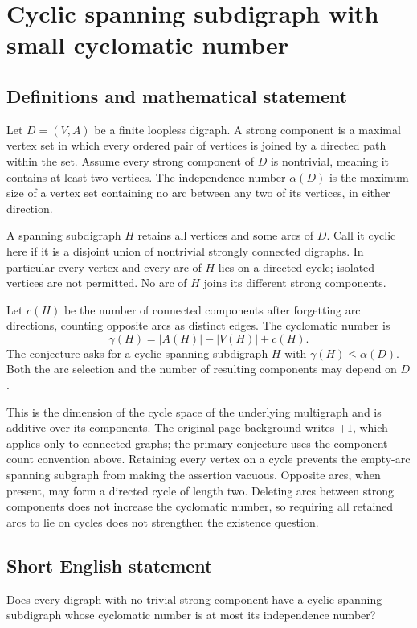 \documentclass[11pt,a4paper]{article}
\begin{document}
\section*{Cyclic spanning subdigraph with small cyclomatic number}\label{statement}

\subsection{Definitions and mathematical statement}
Let $D=(V,A)$ be a finite loopless digraph. A strong component is a maximal vertex set in which every ordered pair of vertices is joined by a directed path within the set. Assume every strong component of $D$ is nontrivial, meaning it contains at least two vertices. The independence number $\alpha(D)$ is the maximum size of a vertex set containing no arc between any two of its vertices, in either direction.

A spanning subdigraph $H$ retains all vertices and some arcs of $D$. Call it cyclic here if it is a disjoint union of nontrivial strongly connected digraphs. In particular every vertex and every arc of $H$ lies on a directed cycle; isolated vertices are not permitted. No arc of $H$ joins its different strong components.

Let $c(H)$ be the number of connected components after forgetting arc directions, counting opposite arcs as distinct edges. The cyclomatic number is
\[
                    \gamma(H)=|A(H)|-|V(H)|+c(H).
\]
The conjecture asks for a cyclic spanning subdigraph $H$ with $\gamma(H)\le\alpha(D)$. Both the arc selection and the number of resulting components may depend on $D$.

This is the dimension of the cycle space of the underlying multigraph and is additive over its components. The original-page background writes $+1$, which applies only to connected graphs; the primary conjecture uses the component-count convention above. Retaining every vertex on a cycle prevents the empty-arc spanning subgraph from making the assertion vacuous. Opposite arcs, when present, may form a directed cycle of length two. Deleting arcs between strong components does not increase the cyclomatic number, so requiring all retained arcs to lie on cycles does not strengthen the existence question.
\subsection{Short English statement}
Does every digraph with no trivial strong component have a cyclic spanning subdigraph whose cyclomatic number is at most its independence number?
\end{document}
